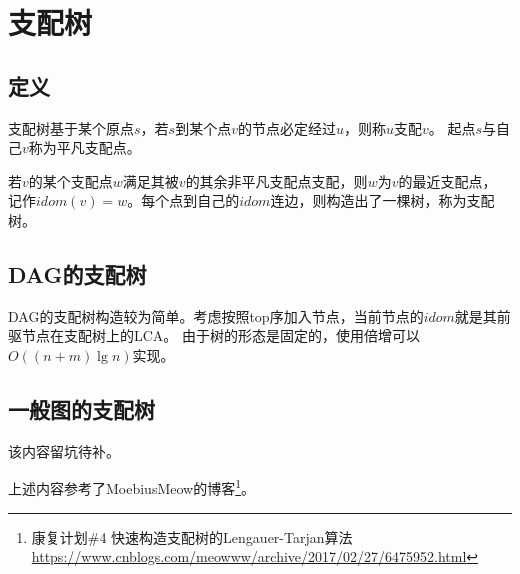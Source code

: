 \section{支配树}
\subsection{定义}
支配树基于某个原点$s$，若$s$到某个点$v$的节点必定经过$u$，则称$u$支配$v$。
起点$s$与自己$v$称为平凡支配点。

若$v$的某个支配点$w$满足其被$v$的其余非平凡支配点支配，则$w$为$v$的最近支配点，
记作$idom(v)=w$。每个点到自己的$idom$连边，则构造出了一棵树，称为支配树。
\subsection{DAG的支配树}
DAG的支配树构造较为简单。考虑按照top序加入节点，当前节点的$idom$就是其前驱节点在支配树上的LCA。
由于树的形态是固定的，使用倍增可以$O((n+m)\lg n)$实现。
\subsection{一般图的支配树}
该内容留坑待补。

上述内容参考了MoebiusMeow的博客\footnote{
    康复计划\#4 快速构造支配树的Lengauer-Tarjan算法\\
    \url{https://www.cnblogs.com/meowww/archive/2017/02/27/6475952.html}
}。
